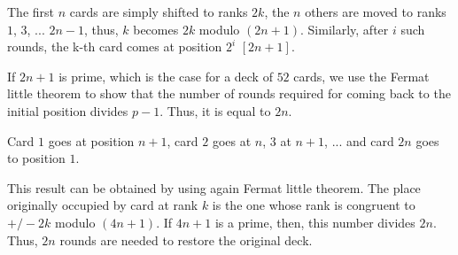 \begin{itemize}
The first $n$ cards are simply shifted to ranks $2k$, the $n$ others are moved to ranks $1$, $3$, ... $2n-1$,
thus, $k$ becomes $2k$ modulo $(2n+1)$. 
Similarly, after $i$ such rounds, the k-th card comes at position $2^i$ $[2n+1]$. 

If $2n+1$ is prime, which is the case for a deck of $52$ cards, 
we use the Fermat little theorem to show that the number of rounds required for coming back to the initial position 
divides $p-1$.
Thus, it is equal to $2n$. 


\smallskip

Card $1$ goes at position $n+1$, card $2$ goes at $n$, $3$ at $n+1$, ... and card $2n$ goes to position $1$.

This result can be obtained by using again Fermat little theorem.
The place originally occupied by card at rank $k$ is the one whose rank is congruent to $+/- 2k$ modulo $(4n+1)$.
If $4n+1$ is a prime, then, this number divides $2n$.
Thus, $2n$ rounds are needed to restore the original deck. 

\end{itemize}






